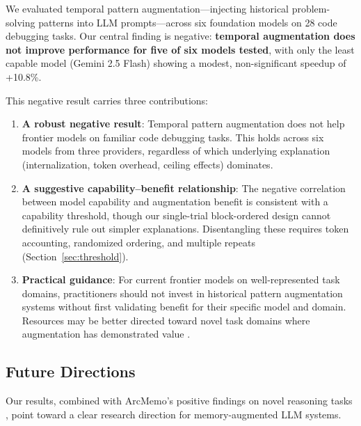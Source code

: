 \documentclass[11pt]{article}
\begin{document}
We evaluated temporal pattern augmentation---injecting historical problem-solving patterns into LLM prompts---across six foundation models on 28 code debugging tasks. Our central finding is negative: \textbf{temporal augmentation does not improve performance for five of six models tested}, with only the least capable model (Gemini 2.5 Flash) showing a modest, non-significant speedup of +10.8\%.

This negative result carries three contributions:
\begin{enumerate}[nosep]
    \item \textbf{A robust negative result}: Temporal pattern augmentation does not help frontier models on familiar code debugging tasks. This holds across six models from three providers, regardless of which underlying explanation (internalization, token overhead, ceiling effects) dominates.
    \item \textbf{A suggestive capability--benefit relationship}: The negative correlation between model capability and augmentation benefit is consistent with a capability threshold, though our single-trial block-ordered design cannot definitively rule out simpler explanations. Disentangling these requires token accounting, randomized ordering, and multiple repeats (Section~\ref{sec:threshold}).
    \item \textbf{Practical guidance}: For current frontier models on well-represented task domains, practitioners should not invest in historical pattern augmentation systems without first validating benefit for their specific model and domain. Resources may be better directed toward novel task domains where augmentation has demonstrated value \citep{ho2025arcmemo}.
\end{enumerate}

\subsection*{Future Directions}

Our results, combined with ArcMemo's positive findings on novel reasoning tasks \citep{ho2025arcmemo}, point toward a clear research direction for memory-augmented LLM systems.
\end{document}
